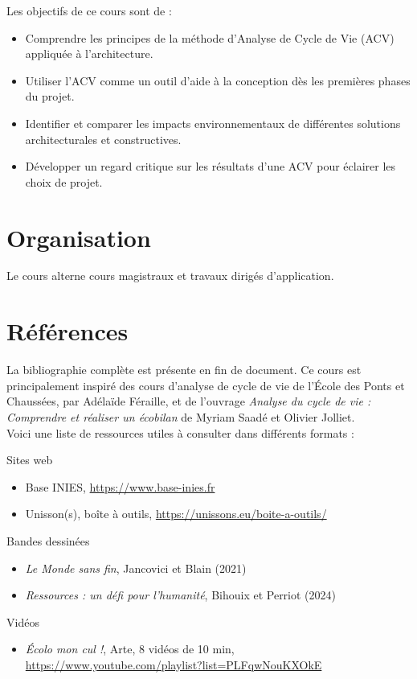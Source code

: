 Les objectifs de ce cours sont de :
\begin{itemize}
  \item Comprendre les principes de la méthode d'Analyse de Cycle de Vie (ACV) appliquée à l'architecture.
  \item Utiliser l'ACV comme un outil d'aide à la conception dès les premières phases du projet.
  \item Identifier et comparer les impacts environnementaux de différentes solutions architecturales et constructives.
  \item Développer un regard critique sur les résultats d'une ACV pour éclairer les choix de projet.
\end{itemize}

\section{Organisation}

Le cours alterne cours magistraux et travaux dirigés d'application.

\section{Références}

La bibliographie complète est présente en fin de document. 
Ce cours est principalement inspiré des cours d'analyse de cycle de vie de l'École des Ponts et Chaussées, par Adélaïde Féraille, et de l'ouvrage \textit{Analyse du cycle de vie : Comprendre et réaliser un écobilan} de Myriam Saadé et Olivier Jolliet. \\

Voici une liste de ressources utiles à consulter dans différents formats :


\begin{encadre}{Sites web}
  \begin{itemize}
  \item Base INIES, \url{https://www.base-inies.fr}
  \item Unisson(s), boîte à outils, \url{https://unissons.eu/boite-a-outils/}
  \end{itemize}
\end{encadre}

\begin{encadre}{Bandes dessinées}
  \begin{itemize}
    \item \textit{Le Monde sans fin}, Jancovici et Blain (2021)
    \item \textit{Ressources : un défi pour l'humanité}, Bihouix et Perriot (2024)
  \end{itemize}
\end{encadre}

\begin{encadre}{Vidéos}
  \begin{itemize}
    \item \textit{Écolo mon cul !}, Arte, 8 vidéos de 10 min, \url{https://www.youtube.com/playlist?list=PLFqwNouKXOkE}
  \end{itemize}
\end{encadre}
